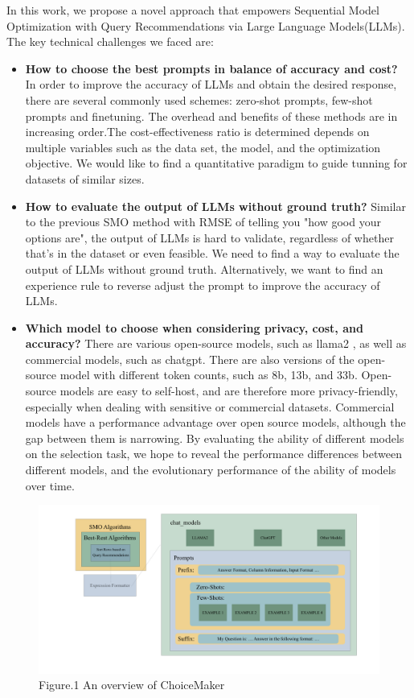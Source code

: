 \documentclass{ieeeaccess}
\begin{document}
In this work, we propose a novel approach that empowers Sequential Model Optimization with Query Recommendations via Large Language Models(LLMs). The key technical challenges we faced are: 
\begin{itemize}
  

\item \textbf{How to choose the best prompts in balance of accuracy and cost?}
In order to improve the accuracy of LLMs and obtain the desired response, there are several commonly used schemes: zero-shot prompts, few-shot prompts and finetuning. The overhead and benefits of these methods are in increasing order.The cost-effectiveness ratio is determined depends on multiple variables such as the data set, the model, and the optimization objective. We would like to find a quantitative paradigm to guide tunning for datasets of similar sizes.

\item \textbf{How to evaluate the output of LLMs without ground truth?}
Similar to the previous SMO method with RMSE of telling you "how good your options are", the output of LLMs is hard to validate, regardless of whether that’s in the dataset or even feasible. We need to find a way to evaluate the output of LLMs without ground truth. Alternatively, we want to find an experience rule to reverse adjust the prompt to improve the accuracy of LLMs.

\item \textbf{Which model to choose when considering privacy, cost, and accuracy?}
There are various open-source models, such as llama2 , as well as commercial models, such as chatgpt. There are also versions of the open-source model with different token counts, such as 8b, 13b, and 33b. Open-source models are easy to self-host, and are therefore more privacy-friendly, especially when dealing with sensitive or commercial datasets. Commercial models have a performance advantage over open source models, although the gap between them is narrowing. By evaluating the ability of different models on the selection task, we hope to reveal the performance differences between different models, and the evolutionary performance of the ability of models over time.
\end{itemize}

\begin{figure}[ht]
    \centering
    \includegraphics[page=1,width=\textwidth]{intro.pdf}
    Figure.1 An overview of ChoiceMaker \label{fig1}
  \end{figure}
\end{document}

